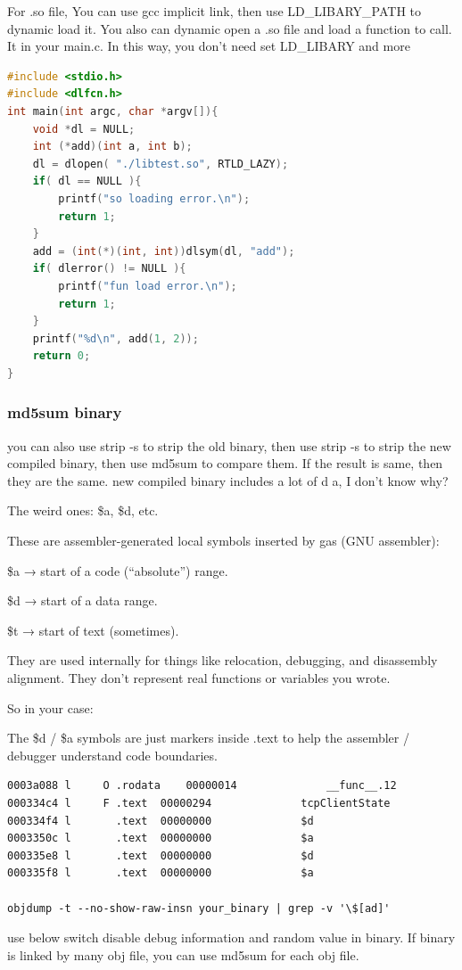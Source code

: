 \documentclass[paper=8.5in:11in, twoside, 12pt, pagesize=pdftex]{book}
\begin{document}
	For .so file, You can use gcc implicit link, then use LD\_LIBARY\_PATH to dynamic load it. You also can dynamic open a .so file and load a function to call. It in your main.c. In this way, you don't need set LD\_LIBARY and more 

\begin{lstlisting}[frame=single, language=c++]
#include <stdio.h>
#include <dlfcn.h>
int main(int argc, char *argv[]){
	void *dl = NULL;
	int (*add)(int a, int b);
	dl = dlopen( "./libtest.so", RTLD_LAZY);
	if( dl == NULL ){
		printf("so loading error.\n");
		return 1;
	}
    add = (int(*)(int, int))dlsym(dl, "add");
	if( dlerror() != NULL ){
        printf("fun load error.\n");
		return 1;
	}
	printf("%d\n", add(1, 2));
	return 0;
}
\end{lstlisting}

\subsubsection{md5sum binary}
you can also use strip -s to strip the old binary, then use strip -s to strip the new compiled binary, then use md5sum to compare them. If the result is same, then they are the same. new compiled binary includes a lot of d a, I don't know why?

The weird ones: \$a, \$d, etc.

These are assembler-generated local symbols inserted by gas (GNU assembler):

\$a → start of a code (“absolute”) range.

\$d → start of a data range.

\$t → start of text (sometimes).

They are used internally for things like relocation, debugging, and disassembly alignment.
They don’t represent real functions or variables you wrote.

So in your case:

The \$d / \$a symbols are just markers inside .text to help the assembler / debugger understand code boundaries.

\begin{lstlisting}
0003a088 l     O .rodata	00000014              __func__.12
000334c4 l     F .text	00000294              tcpClientState
000334f4 l       .text	00000000              $d
0003350c l       .text	00000000              $a
000335e8 l       .text	00000000              $d
000335f8 l       .text	00000000              $a

objdump -t --no-show-raw-insn your_binary | grep -v '\$[ad]'
\end{lstlisting}
\par use below switch disable debug information and random value in binary. If binary is linked by many obj file, you can use md5sum for each obj file. 
\end{document}
